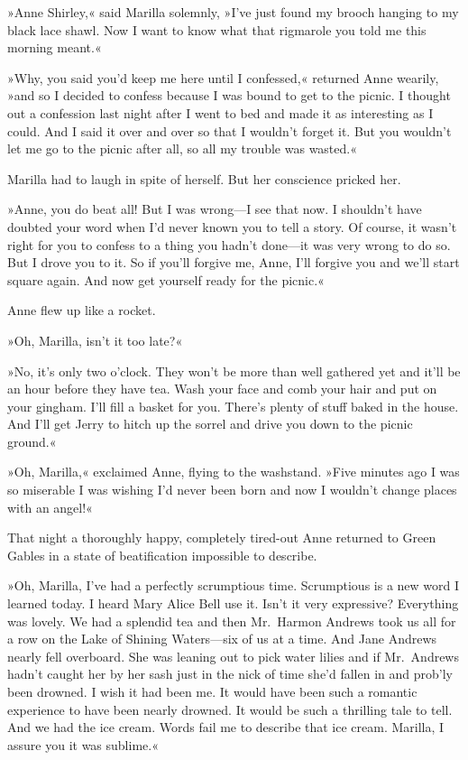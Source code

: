 »Anne Shirley,« said Marilla solemnly, »I've just found my brooch hanging to my black lace shawl. Now I want to know what that rigmarole you told me this morning meant.«

»Why, you said you'd keep me here until I confessed,« returned Anne wearily, »and so I decided to confess because I was bound to get to the picnic. I thought out a confession last night after I went to bed and made it as interesting as I could. And I said it over and over so that I wouldn't forget it. But you wouldn't let me go to the picnic after all, so all my trouble was wasted.«

Marilla had to laugh in spite of herself. But her conscience pricked her.

»Anne, you do beat all! But I was wrong—I see that now. I shouldn't have doubted your word when I'd never known you to tell a story. Of course, it wasn't right for you to confess to a thing you hadn't done—it was very wrong to do so. But I drove you to it. So if you'll forgive me, Anne, I'll forgive you and we'll start square again. And now get yourself ready for the picnic.«

Anne flew up like a rocket.

»Oh, Marilla, isn't it too late?«

»No, it's only two o'clock. They won't be more than well gathered yet and it'll be an hour before they have tea. Wash your face and comb your hair and put on your gingham. I'll fill a basket for you. There's plenty of stuff baked in the house. And I'll get Jerry to hitch up the sorrel and drive you down to the picnic ground.«

»Oh, Marilla,« exclaimed Anne, flying to the washstand. »Five minutes ago I was so miserable I was wishing I'd never been born and now I wouldn't change places with an angel!«

That night a thoroughly happy, completely tired-out Anne returned to Green Gables in a state of beatification impossible to describe.

»Oh, Marilla, I've had a perfectly scrumptious time. Scrumptious is a new word I learned today. I heard Mary Alice Bell use it. Isn't it very expressive? Everything was lovely. We had a splendid tea and then Mr.~Harmon Andrews took us all for a row on the Lake of Shining Waters—six of us at a time. And Jane Andrews nearly fell overboard. She was leaning out to pick water lilies and if Mr.~Andrews hadn't caught her by her sash just in the nick of time she'd fallen in and prob'ly been drowned. I wish it had been me. It would have been such a romantic experience to have been nearly drowned. It would be such a thrilling tale to tell. And we had the ice cream. Words fail me to describe that ice cream. Marilla, I assure you it was sublime.«

